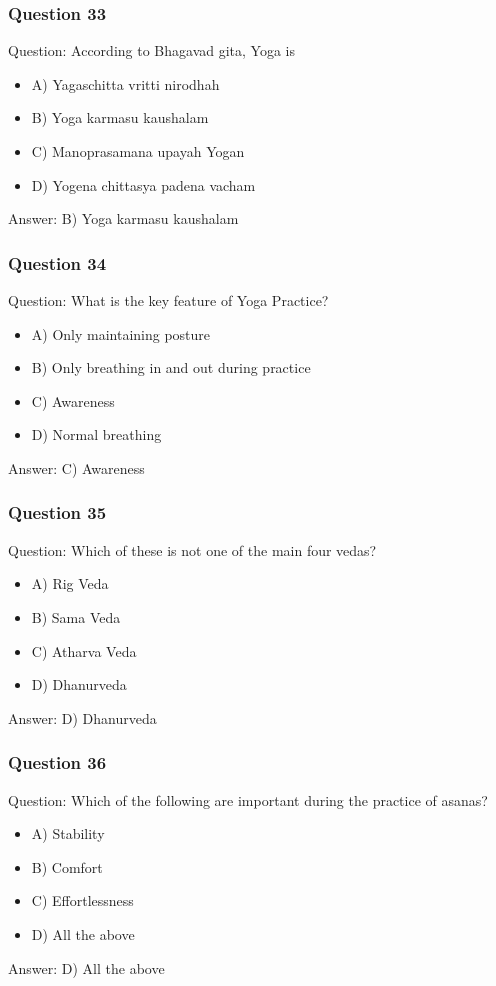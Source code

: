 \begin{frame}[fragile]\frametitle{Question 33}
Question: According to Bhagavad gita, Yoga is
\begin{itemize}
\item A) Yagaschitta vritti nirodhah
\item B) Yoga karmasu kaushalam
\item C) Manoprasamana upayah Yogan
\item D) Yogena chittasya padena vacham
\end{itemize}
Answer: B) Yoga karmasu kaushalam
\end{frame}

\begin{frame}[fragile]\frametitle{Question 34}
Question: What is the key feature of Yoga Practice?
\begin{itemize}
\item A) Only maintaining posture
\item B) Only breathing in and out during practice
\item C) Awareness
\item D) Normal breathing
\end{itemize}
Answer: C) Awareness
\end{frame}

\begin{frame}[fragile]\frametitle{Question 35}
Question: Which of these is not one of the main four vedas?
\begin{itemize}
\item A) Rig Veda
\item B) Sama Veda
\item C) Atharva Veda
\item D) Dhanurveda
\end{itemize}
Answer: D) Dhanurveda
\end{frame}

\begin{frame}[fragile]\frametitle{Question 36}
Question: Which of the following are important during the practice of asanas?
\begin{itemize}
\item A) Stability
\item B) Comfort
\item C) Effortlessness
\item D) All the above
\end{itemize}
Answer: D) All the above
\end{frame}

